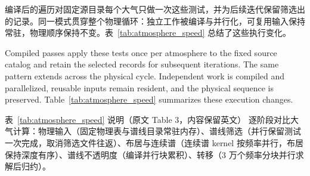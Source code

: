 编译后的遍历对固定源目录每个大气只做一次这些测试，并为后续迭代保留筛选出的记录。同一模式贯穿整个物理循环：独立工作被编译与并行化，可复用输入保持常驻，物理顺序保持不变。表~\ref{tab:atmosphere_speed} 总结了这些执行变化。

\begin{EN}
Compiled passes apply these tests once per atmosphere to the fixed source
catalog and retain the selected records for subsequent iterations. The same
pattern extends across the physical cycle. Independent work is compiled and
parallelized, reusable inputs remain resident, and the physical sequence is
preserved. Table~\ref{tab:atmosphere_speed} summarizes these execution changes.
\end{EN}

\begin{notebox}{表~\ref{tab:atmosphere_speed} 说明（原文 Table 3，内容保留英文）}
逐阶段对比大气计算：物理输入（固定物理表与谱线目录常驻内存）、谱线筛选（并行保留测试一次完成，取消筛选文件往返）、布居与连续谱（连续谱 kernel 按频率并行，布居保持深度有序）、谱线不透明度（编译并行块累积）、转移（3 万个频率分块并行求解后归约）。
\end{notebox}

